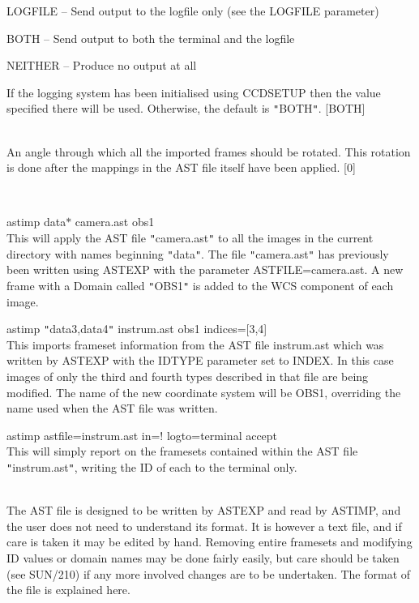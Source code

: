 \documentclass[twoside,11pt]{article}
\newcommand{\htmlref}[2]{#1}
\newcommand{\xref}[3]{#1}
\renewcommand{\_}{\texttt{\symbol{95}}}
\newcommand{\qt}[1]{{\tt "}#1{\tt "}}
\newcommand{\xroutine}[1]{\htmlref{{\sc #1}}{#1}}
\newcommand{\sstexamples}[1]{
   \item[Examples:] \mbox{} \\
   \vspace{-3.5ex}
   \begin{description}
      #1
   \end{description}
}
\newcommand{\sstsubsection}[1]{ \item[{#1}] \mbox{} \\}
\newcommand{\sstexamplesubsection}[2]{\sloppy \item{\ssttt #1} \mbox{} \\ #2 }
\newcommand{\sstdiytopic}[2]{\item[#1:] \mbox{} \\[1.3ex] #2}
\newcommand{\sstitem}{\item}
\newcommand{\sstexamples}[1]{
      \item[Examples:] \\
      \begin{description}
         #1
      \end{description}
      \\
   }
\newcommand{\sstsubsection}[1]{\item[{#1}]}
\newcommand{\sstexamplesubsection}[2]{\item[{\ssttt #1}] #2}
\newcommand{\sstdiytopic}[2]{\item[{#1}] #2 }
\newcommand{\sstitem}{\item}
\begin{document}
{{{{            \sstitem
               LOGFILE   -- Send output to the logfile only (see the
                               LOGFILE parameter)

            \sstitem
               BOTH      -- Send output to both the terminal and the
                               logfile

            \sstitem
               NEITHER   -- Produce no output at all

         }
         If the logging system has been initialised using \xroutine{CCDSETUP}
         then the value specified there will be used. Otherwise, the
         default is \qt{BOTH}.
         [BOTH]
      }
      \sstsubsection{
         ROT = \_DOUBLE (Read)
      } {
         An angle through which all the imported frames should be
         rotated.  This rotation is done after the mappings in the AST
         file itself have been applied.
         [0]
      }
   }
   \sstexamples{
      \sstexamplesubsection{
         astimp data$*$ camera.ast obs1
      } {
         This will apply the AST file \qt{camera.ast} to all the images in
         the current directory with names beginning \qt{data}.  The file
         \qt{camera.ast} has previously been written using \xroutine{ASTEXP} 
         with the parameter ASTFILE=camera.ast.  A new frame with a Domain
         called \qt{OBS1} is added to the WCS component of each image.
      }
      \sstexamplesubsection{
         astimp \qt{data3,data4} instrum.ast obs1 indices=[3,4]
      } {
         This imports frameset information from the AST file
         instrum.ast which was written by ASTEXP with the IDTYPE
         parameter set to INDEX.  In this case images of only the third
         and fourth types described in that file are being modified.
         The name of the new coordinate system will be OBS1,
         overriding the name used when the AST file was written.
      }
      \sstexamplesubsection{
         astimp astfile=instrum.ast in=! logto=terminal accept
      } {
         This will simply report on the framesets contained within
         the AST file \qt{instrum.ast}, writing the ID of each to the
         terminal only.
      }
   }
   \sstdiytopic{
      AST file format
   } {
         The AST file is designed to be written by ASTEXP and read by
         ASTIMP, and the user does not need to understand its format.
         It is however a text file, and if care is taken it may be
         edited by hand.  Removing entire framesets and modifying ID
         values or domain names may be done fairly easily, but care
         should be taken (see \xref{SUN/210}{sun210}{}) if any more involved changes
         are to be undertaken.  The format of the file is explained
         here.

}}
\end{document}
